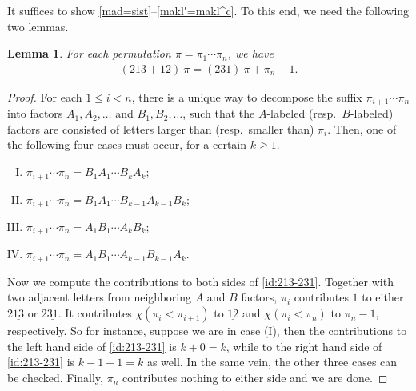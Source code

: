 \documentclass[12pt]{amsart}
\numberwithin{equation}{section}
\theoremstyle{plain}
\newtheorem{lemma}[theorem]{Lemma}
\theoremstyle{definition}
\def\pprs{\mathrm{2\underline{13}}}
\def\ppwrs{\mathrm{2\underline{31}}}
\begin{document}
It suffices to show \eqref{mad=sist}--\eqref{makl'=makl^c}. To this end, we need the following two lemmas.
\begin{lemma}
For each permutation $\pi=\pi_1\cdots\pi_n$, we have
\begin{align}
\label{id:213-231}
(\pprs+\mathrm{\underline{12}})\:\pi = (\ppwrs)\:\pi+\pi_n-1.
\end{align}
\end{lemma}
\begin{proof}
For each $1\le i<n$, there is a unique way to decompose the suffix $\pi_{i+1}\cdots\pi_n$ into factors $A_1,A_2,\ldots$ and $B_1,B_2,\ldots$, such that the $A$-labeled (resp.~$B$-labeled) factors are consisted of letters larger than (resp.~smaller than) $\pi_i$. Then, one of the following four cases must occur, for a certain $k\ge 1$.
\begin{enumerate}[(I)]
    \item $\pi_{i+1}\cdots\pi_n=B_1A_1\cdots B_kA_k$;
    \item $\pi_{i+1}\cdots\pi_n=B_1A_1\cdots B_{k-1}A_{k-1}B_k$;
    \item $\pi_{i+1}\cdots\pi_n=A_1B_1\cdots A_kB_k$;
    \item $\pi_{i+1}\cdots\pi_n=A_1B_1\cdots A_{k-1}B_{k-1}A_k$.
\end{enumerate}
Now we compute the contributions to both sides of \eqref{id:213-231}. Together with two adjacent letters from neighboring $A$ and $B$ factors, $\pi_i$ contributes $1$ to either $\pprs$ or $\ppwrs$. It contributes $\chi(\pi_i<\pi_{i+1})$ to $\mathrm{\underline{12}}$ and $\chi(\pi_i<\pi_n)$ to $\pi_n-1$, respectively. So for instance, suppose we are in case (I), then the contributions to the left hand side of \eqref{id:213-231} is $k+0=k$, while to the right hand side of \eqref{id:213-231} is $k-1+1=k$ as well. In the same vein, the other three cases can be checked. Finally, $\pi_n$ contributes nothing to either side and we are done.
\end{proof}
\end{document}
